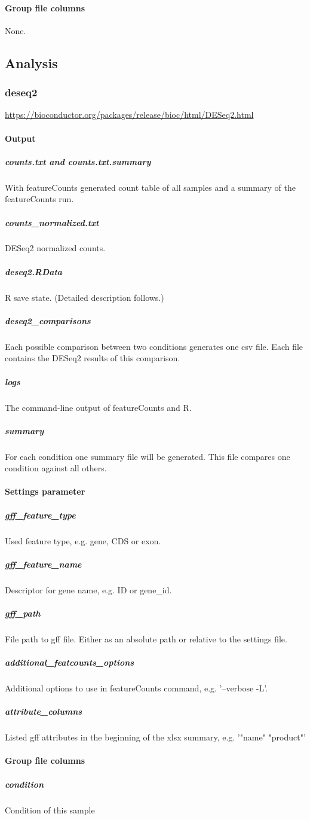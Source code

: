 \documentclass[a4paper]{article}
\begin{document}
\paragraph{Group file columns} None.


\subsection{Analysis}
\subsubsection{deseq2}
\url{https://bioconductor.org/packages/release/bioc/html/DESeq2.html}
\paragraph{Output} 
\subparagraph{counts.txt and counts.txt.summary}
With featureCounts generated count table of all samples and a summary of the featureCounts run.
\subparagraph{counts\_normalized.txt}
DESeq2 normalized counts.
\subparagraph{deseq2.RData}
R save state. (Detailed description follows.)
\subparagraph{deseq2\_comparisons}
Each possible comparison between two conditions generates one csv file. Each file contains the DESeq2 results of this comparison.
\subparagraph{logs}
The command-line output of featureCounts and R.
\subparagraph{summary}
For each condition one summary file will be generated. This file compares one condition against all others.
\paragraph{Settings parameter}
\subparagraph{gff\_feature\_type}
Used feature type, e.g. gene, CDS or exon.
\subparagraph{gff\_feature\_name}
Descriptor for gene name, e.g. ID or gene\_id.
\subparagraph{gff\_path}
File path to gff file. Either as an absolute path or relative to the settings file.
\subparagraph{additional\_featcounts\_options}
Additional options to use in featureCounts command, e.g. '--verbose -L'. 
\subparagraph{attribute\_columns}
Listed gff attributes in the beginning of the xlsx summary, e.g. '"name" "product"'
\paragraph{Group file columns}
\subparagraph{condition}
Condition of this sample
\end{document}
